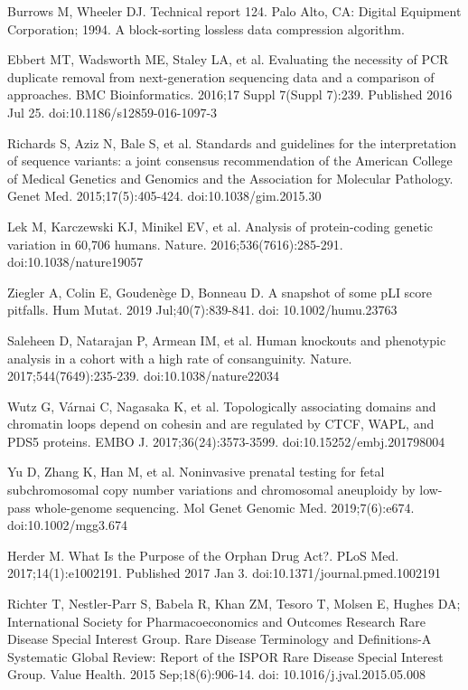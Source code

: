\documentclass[a4paper,12pt]{article}
\begin{document}
\begin{thebibliography}{300}
Burrows M, Wheeler DJ. Technical report 124. Palo Alto, CA: Digital Equipment Corporation; 1994. A block-sorting lossless data compression algorithm.

Ebbert MT, Wadsworth ME, Staley LA, et al. Evaluating the necessity of PCR duplicate removal from next-generation sequencing data and a comparison of approaches. BMC Bioinformatics. 2016;17 Suppl 7(Suppl 7):239. Published 2016 Jul 25. doi:10.1186/s12859-016-1097-3

Richards S, Aziz N, Bale S, et al. Standards and guidelines for the interpretation of sequence variants: a joint consensus recommendation of the American College of Medical Genetics and Genomics and the Association for Molecular Pathology. Genet Med. 2015;17(5):405-424. doi:10.1038/gim.2015.30

Lek M, Karczewski KJ, Minikel EV, et al. Analysis of protein-coding genetic variation in 60,706 humans. Nature. 2016;536(7616):285-291. doi:10.1038/nature19057

Ziegler A, Colin E, Goudenège D, Bonneau D. A snapshot of some pLI score pitfalls. Hum Mutat. 2019 Jul;40(7):839-841. doi: 10.1002/humu.23763

Saleheen D, Natarajan P, Armean IM, et al. Human knockouts and phenotypic analysis in a cohort with a high rate of consanguinity. Nature. 2017;544(7649):235-239. doi:10.1038/nature22034

Wutz G, Várnai C, Nagasaka K, et al. Topologically associating domains and chromatin loops depend on cohesin and are regulated by CTCF, WAPL, and PDS5 proteins. EMBO J. 2017;36(24):3573-3599. doi:10.15252/embj.201798004

Yu D, Zhang K, Han M, et al. Noninvasive prenatal testing for fetal subchromosomal copy number variations and chromosomal aneuploidy by low-pass whole-genome sequencing. Mol Genet Genomic Med. 2019;7(6):e674. doi:10.1002/mgg3.674

Herder M. What Is the Purpose of the Orphan Drug Act?. PLoS Med. 2017;14(1):e1002191. Published 2017 Jan 3. doi:10.1371/journal.pmed.1002191

Richter T, Nestler-Parr S, Babela R, Khan ZM, Tesoro T, Molsen E, Hughes DA; International Society for Pharmacoeconomics and Outcomes Research Rare Disease Special Interest Group. Rare Disease Terminology and Definitions-A Systematic Global Review: Report of the ISPOR Rare Disease Special Interest Group. Value Health. 2015 Sep;18(6):906-14. doi: 10.1016/j.jval.2015.05.008


\end{thebibliography}
\end{document}
